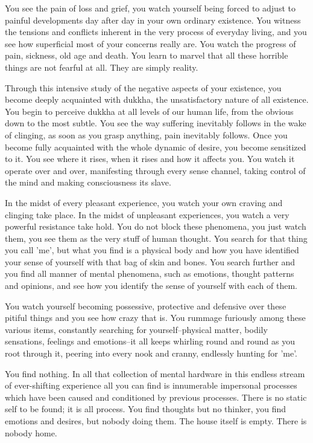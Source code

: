 You see the pain of loss and grief, you watch yourself being forced to adjust to
painful developments day after day in your own ordinary existence. You witness
the tensions and conflicts inherent in the very process of everyday living, and
you see how superficial most of your concerns really are. You watch the progress
of pain, sickness, old age and death. You learn to marvel that all these
horrible things are not fearful at all. They are simply reality.

Through this intensive study of the negative aspects of your existence, you
become deeply acquainted with dukkha, the unsatisfactory nature of all
existence. You begin to perceive dukkha at all levels of our human life, from
the obvious down to the most subtle. You see the way suffering inevitably
follows in the wake of clinging, as soon as you grasp anything, pain inevitably
follows. Once you become fully acquainted with the whole dynamic of desire, you
become sensitized to it. You see where it rises, when it rises and how it
affects you. You watch it operate over and over, manifesting through every sense
channel, taking control of the mind and making consciousness its slave.

In the midst of every pleasant experience, you watch your own craving and
clinging take place. In the midst of unpleasant experiences, you watch a very
powerful resistance take hold. You do not block these phenomena, you just watch
them, you see them as the very stuff of human thought. You search for that thing
you call 'me', but what you find is a physical body and how you have identified
your sense of yourself with that bag of skin and bones. You search further and
you find all manner of mental phenomena, such as emotions, thought patterns and
opinions, and see how you identify the sense of yourself with each of them.

You watch yourself becoming possessive, protective and defensive over these
pitiful things and you see how crazy that is. You rummage furiously among these
various items, constantly searching for yourself--physical matter, bodily
sensations, feelings and emotions--it all keeps whirling round and round as you
root through it, peering into every nook and cranny, endlessly hunting for 'me'.

You find nothing. In all that collection of mental hardware in this endless
stream of ever-shifting experience all you can find is innumerable impersonal
processes which have been caused and conditioned by previous processes. There is
no static self to be found; it is all process. You find thoughts but no thinker,
you find emotions and desires, but nobody doing them. The house itself is empty.
There is nobody home.

